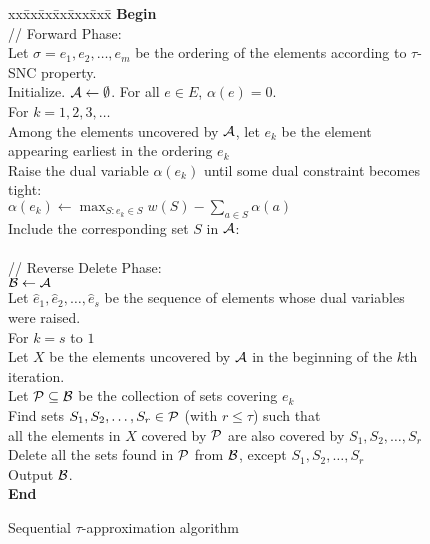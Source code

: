 \documentclass[11pt]{article}
\newcommand{\calA} {{\cal A}}
\newcommand{\calB} {{\cal B}}
\newcommand{\calP} {{\cal P}}
\newcommand{\wh}[1] {\widehat{#1}}
\begin{document}
\begin{figure}[t]
\begin{center}
\begin{boxedminipage}{\hsize}
\begin{small}
\begin{tabbing}
xx\=xx\=xx\=xx\=xxx\=xxx\=\kill
\textbf{Begin}  \\
\> // Forward Phase:\\
\> Let $\sigma=e_1, e_2, \ldots, e_m$ be the ordering of the elements according to $\tau$-SNC property.\\
\> Initialize. $\calA \leftarrow \emptyset$. For all $e\in E$, $\alpha(e)=0$.\\
\> For $k=1,2,3, \ldots$\\
\> \> Among the elements uncovered by $\calA$, let $e_k$ be the element appearing earliest in the ordering $e_k$\\
\> \> Raise the dual variable $\alpha(e_k)$ until some dual constraint becomes tight:\\
\> \> \> $\alpha(e_k) \leftarrow \max_{S:e_k\in S} w(S) - \sum_{a\in S} \alpha(a)$\\
\> \> \> Include the corresponding set $S$ in $\calA$:\\
\> \> \\
\> // Reverse Delete Phase:\\
\> $\calB \leftarrow \calA$\\
\> Let $\wh{e}_1, \wh{e}_2, \ldots, \wh{e}_s$ be the sequence of elements whose dual variables were raised.\\
\> For $k=s$ to $1$\\
\> \> Let $X$ be the elements uncovered by $\calA$ in the beginning of the $k$th iteration.\\
\> \> Let $\calP\subseteq \calB$ be the collection of sets covering $e_k$\\
\> \> Find sets $S_1, S_2, \ldots, S_r\in \calP$ (with $r\leq \tau$) such that\\
\> \> \> all the elements in $X$ covered by $\calP$ are also covered by $S_1, S_2, \ldots, S_r$\\
\> \> Delete all the sets found in $\calP$ from $\calB$, except $S_1, S_2, \ldots, S_r$\\
\> \> Output $\calB$.\\
\textbf{End}
\end{tabbing}
\end{small}
\end{boxedminipage}
\end{center}
\caption{Sequential $\tau$-approximation algorithm}
\label{fig:seq-pseudo}
\end{figure}
\end{document}
